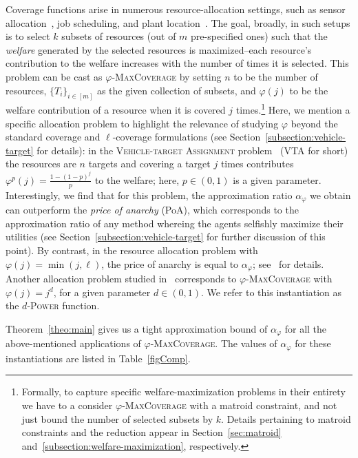 Coverage functions arise in numerous resource-allocation settings, such as sensor allocation~\cite{MW08}, job scheduling, and plant location~\cite{CFN77}. The goal, broadly, in such setups is to select $k$ subsets of resources (out of $m$ pre-specified ones) such that the \emph{welfare} generated by the selected resources is maximized--each resource's contribution to the welfare increases with the number of times it is selected. This problem can be cast as $\varphi$-\textsc{MaxCoverage} by setting $n$ to be the number of resources, $\{T_i\}_{i\in [m]}$ as the given collection of subsets, and $\varphi(j)$ to be the welfare contribution of a resource when it is covered $j$ times.\footnote{Formally, to capture specific welfare-maximization problems in their entirety we have to a consider $\varphi$-\textsc{MaxCoverage} with a matroid constraint, and not just bound the number of selected subsets by $k$. Details pertaining to matroid constraints and the reduction appear in Section~\ref{sec:matroid} and~\ref{subsection:welfare-maximization}, respectively.}  Here, we mention a specific allocation problem to highlight the relevance of studying $\varphi$ beyond the standard coverage and $\ell$-coverage formulations (see Section~\ref{subsection:vehicle-target} for details): in the \textsc{Vehicle-target Assignment} problem~\cite{Murphey00,PM19} (\textsc{VTA} for short) the resources are $n$ targets and covering a target $j$ times contributes $\varphi^p(j) = \frac{1-(1-p)^j}{p}$ to the welfare; here, $p \in (0,1)$ is a given parameter. Interestingly, we find that for this problem, the approximation ratio $\alpha_{\varphi}$ we obtain can outperform the \emph{price of anarchy} (PoA), which corresponds to the approximation ratio of any method whereing the agents selfishly maximize their utilities (see Section~\ref{subsection:vehicle-target} for further discussion of this point). By contrast, in the resource allocation problem with $\varphi(j) = \min(j, \ell)$, the price of anarchy is equal to $\alpha_{\varphi}$; see~\cite{CPM19} for details. Another allocation problem studied in~\cite{PM19} corresponds to $\varphi$-\textsc{MaxCoverage} with $\varphi(j) = j^d$, for a given parameter $d \in (0,1)$. We refer to this instantiation as the $d$-\textsc{Power} function. 

Theorem~\ref{theo:main} gives us a tight approximation bound of $\alpha_{\varphi}$ for all the above-mentioned applications of $\varphi$-\textsc{MaxCoverage}. The values of $\alpha_{\varphi}$ for these instantiations are listed in Table~\ref{figComp}. 


